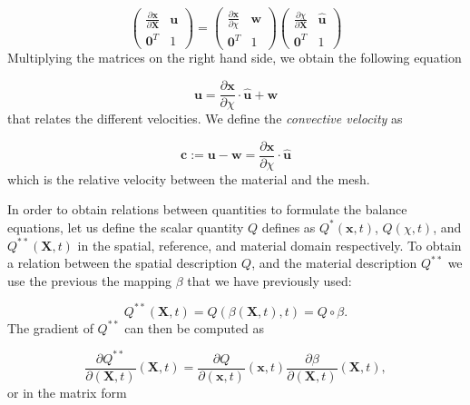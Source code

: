 \documentclass[a4paper,11pt,oneside]{book}
\begin{document}
\begin{equation}
\begin{pmatrix}
\frac{\partial \mathbf{x}}{\partial \mathbf{X}} & \mathbf{u}\\
\mathbf{0}^T & 1
\end{pmatrix} = 
\begin{pmatrix}
\frac{\partial \mathbf{x}}{\partial \chi} & \mathbf{w}\\
\mathbf{0}^T & 1
\end{pmatrix}
\begin{pmatrix}
\frac{\partial \chi}{\partial \mathbf{X}} & \hat{\mathbf{u}}\\
\mathbf{0}^T & 1
\end{pmatrix}
\end{equation}
Multiplying the matrices on the right hand side, we obtain the following equation

\begin{equation}
\mathbf{u} = \frac{\partial \mathbf{x}}{\partial \chi} \cdot \hat{\mathbf{u}} + \mathbf{w}
\end{equation}
that relates the different velocities. We define the \emph{convective velocity} as

\begin{equation}
\mathbf{c} := \mathbf{u} -\mathbf{w} = \frac{\partial \mathbf{x}}{\partial \chi} \cdot \hat{\mathbf{u}}
\end{equation}
which is the relative velocity between the material and the mesh.

In order to obtain relations between quantities to formulate the balance equations, let us define the scalar quantity $Q$ defines as $Q^{*}(\mathbf{x},t)$, $Q(\chi,t)$, and $Q^{**}(\mathbf{X},t)$ in the spatial, reference, and material domain respectively.
To obtain a relation between the spatial description $Q$, and the material description $Q^{**}$ we use the previous the mapping $\beta$ that we have previously used:

\begin{equation}
Q^{**}(\mathbf{X},t) = Q(\beta(\mathbf{X},t),t) = Q \circ \beta.
\end{equation}
The gradient of $Q^{**}$ can then be computed as

\begin{equation}
\label{eq:ale:1}
\frac{\partial Q^{**}}{\partial (\mathbf{X}, t)} (\mathbf{X},t) = 
\frac{\partial Q}{\partial (\mathbf{x}, t)} (\mathbf{x},t)
\frac{\partial \beta}{\partial (\mathbf{X}, t)} (\mathbf{X},t),
\end{equation}
or in the matrix form
\end{document}
